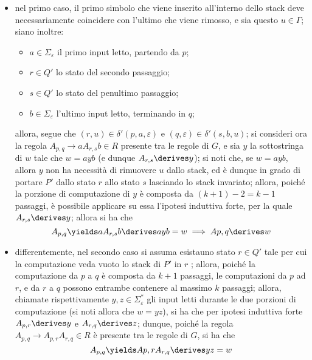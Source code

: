 \documentclass[a4paper, 12pt]{report}
\begin{document}
{\begin{enumerate}[label=]
\begin{enumerate}[label=]
                        \begin{itemize}
                            \item nel primo caso, il primo simbolo che viene inserito all'interno dello stack deve necessariamente coincidere con l'ultimo che viene rimosso, e sia questo $u \in \Gamma$; siano inoltre:
                                \begin{itemize}
                                    \item $a \in \Sigma_\varepsilon$ il primo input letto, partendo da $p$;
                                    \item $r \in Q'$ lo stato del secondo passaggio;
                                    \item $s \in Q'$ lo stato del penultimo passaggio;
                                    \item $b \in \Sigma_\varepsilon$ l'ultimo input letto, terminando in $q$;
                                \end{itemize}

                                allora, segue che $(r, u) \in \delta'(p, a, \varepsilon)$ e $(q, \varepsilon) \in \delta'(s, b, u)$; si consideri ora la regola $A_{p,q} \to a A_{r,s} b \in R$ presente tra le regole di $G$, e sia $y$ la sottostringa di $w$ tale che $w = ayb$ (e dunque $A_{r,s} \derives y$); si noti che, se $w = ayb$, allora $y$ non ha necessità di rimuovere $u$ dallo stack, ed è dunque in grado di portare $P'$ dallo stato $r$ allo stato $s$ lasciando lo stack invariato; allora, poiché la porzione di computazione di $y$ è composta da $(k + 1) - 2 = k - 1$ passaggi, è possibile applicare su essa l'ipotesi induttiva forte, per la quale $A_{r,s} \derives y$; allora si ha che $$A_{p,q} \yields a A_{r,s}b \derives ayb = w \implies A{p,q} \derives w$$
                            \item differentemente, nel secondo caso si assuma esistauno stato $r \in Q'$ tale per cui la computazione veda vuoto lo stack di $P'$ in $r$ ; allora, poiché la computazione da $p$ a $q$ è composta da $k + 1$ passaggi, le computazioni da $p$ ad $r$, e da $r$ a $q$ possono entrambe contenere al massimo $k$ passaggi; allora, chiamate rispettivamente $y, z \in \Sigma_\varepsilon^*$ gli input letti durante le due porzioni di computazione (si noti allora che $w = yz$), si ha che per ipotesi induttiva forte $A_{p,r} \derives y$ e $A_{r,q} \derives z$; dunque, poiché la regola $A_{p,q} \to A_{p,r}A_{r,q} \in R$ è presente tra le regole di $G$, si ha che $$A_{p,q} \yields A{p,r}A_{r,q} \derives yz = w$$
                        \end{itemize}
                \end{enumerate}
        \end{enumerate}

}
\end{document}

